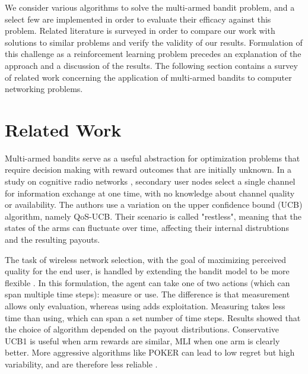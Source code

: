\documentclass{article}
\begin{document}
We consider various algorithms to solve the multi-armed bandit problem, and a select few are implemented in order to evaluate their efficacy against this problem. 
Related literature is surveyed in order to compare our work with solutions to similar problems and verify the validity of our results. Formulation of this challenge 
as a reinforcement learning problem precedes an explanation of the approach and a discussion of the results. The following section contains a survey of related work 
concerning the application of multi-armed bandits to computer networking problems.

\section{Related Work}

Multi-armed bandits serve as a useful abstraction for optimization problems that require decision making with reward outcomes that are initially unknown. In a study 
on cognitive radio networks \cite{qos_selection_mab}, secondary user nodes select a single channel for information exchange at one time, with no knowledge about 
channel quality or availability. The authors use a variation on the upper confidence bound (UCB) algorithm, namely QoS-UCB. Their scenario is called "restless", 
meaning that the states of the arms can fluctuate over time, affecting their internal distrubtions and the resulting payouts.

The task of wireless network selection, with the goal of maximizing perceived quality for the end user, is handled by extending the bandit model to be more flexible 
\cite{muMAB_wireless}. In this formulation, the agent can take one of two actions (which can span multiple time steps): measure or use. The difference is that 
measurement allows only evaluation, whereas using adds exploitation. Measuring takes less time than using, which can span a set number of time steps. Results showed 
that the choice of algorithm depended on the payout distributions. Conservative UCB1 is useful when arm rewards are similar, MLI when one arm is clearly better. 
More aggressive algorithms like POKER can lead to low regret but high variability, and are therefore less reliable \cite{muMAB_wireless}.
\end{document}
